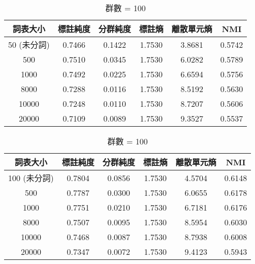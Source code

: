 
        \begin{table}[!htbp]
            \centering
            \begin{subtable}[t]{\textwidth}
                \centering
                \begin{tabular}{|c|c|c|c|c|c|} \hline 
                        詞表大小  & 標註純度 & 分群純度 & 標註熵 & 離散單元熵 &     NMI   \\ \hline 
                       50 (未分詞)&   0.7466  &  0.1422 & 1.7530 &   3.8681 &  0.5742 \\ \hline 
                           500    &  0.7510  &  0.0345  & 1.7530 &  6.0282  &     0.5789  \\ \hline 
                          1000    &  0.7492  &  0.0225  & 1.7530 &  6.6594  &     0.5756  \\ \hline 
                          8000    &  0.7288  &  0.0116  & 1.7530 &  8.5192  &     0.5630  \\ \hline 
                         10000    &  0.7248  &  0.0110  & 1.7530 &  8.7207  &     0.5606  \\ \hline 
                         20000    &  0.7109  &  0.0089  & 1.7530 &  9.3527  &     0.5537  \\ \hline 
                \end{tabular}
\caption{群數 = 50}
                \label{tab:ch4-hubert-pcls-clu050}
            \end{subtable}        

            \jefftablesep        

            \begin{subtable}[t]{\textwidth}
                \centering
                \begin{tabular}{|c|c|c|c|c|c|} \hline 
                        詞表大小  & 標註純度 & 分群純度 & 標註熵 & 離散單元熵 &     NMI   \\ \hline 
 100 (未分詞)&              0.7804 &   0.0856 &         1.7530 &     4.5704 &  0.6148\\ \hline 
                           500    &  0.7787  &  0.0300  & 1.7530 &  6.0655  &     0.6178  \\ \hline 
                          1000    &  0.7751  &  0.0210  & 1.7530 &  6.7181  &     0.6176  \\ \hline 
                          8000    &  0.7507  &  0.0095  & 1.7530 &  8.5954  &     0.6030  \\ \hline 
                         10000    &  0.7468  &  0.0087  & 1.7530 &  8.7938  &     0.6008  \\ \hline 
                         20000    &  0.7347  &  0.0072  & 1.7530 &  9.4123  &     0.5943  \\ \hline 
                \end{tabular}
\caption{群數 = 100}
                \label{tab:ch4-hubert-pcls-clu100}
            \end{subtable}        


\end{table}

